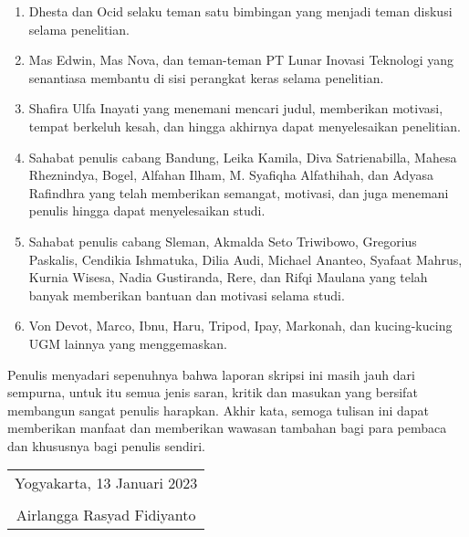 \begin{enumerate}
	\item Dhesta dan Ocid selaku teman satu bimbingan yang menjadi teman diskusi selama penelitian.
	
	\item Mas Edwin, Mas Nova, dan teman-teman PT Lunar Inovasi Teknologi yang senantiasa membantu di sisi perangkat keras selama penelitian.
	
	\item Shafira Ulfa Inayati yang menemani mencari judul, memberikan motivasi, tempat berkeluh kesah, dan hingga akhirnya dapat menyelesaikan penelitian.
	
	\item Sahabat penulis cabang Bandung, Leika Kamila, Diva Satrienabilla, Mahesa Rheznindya, Bogel, Alfahan Ilham, M. Syafiqha Alfathihah, dan Adyasa Rafindhra yang telah memberikan semangat, motivasi, dan juga menemani penulis hingga dapat menyelesaikan studi.
	
	\item Sahabat penulis cabang Sleman, Akmalda Seto Triwibowo, Gregorius Paskalis, Cendikia Ishmatuka, Dilia Audi, Michael Ananteo, Syafaat Mahrus, Kurnia Wisesa, Nadia Gustiranda, Rere, dan Rifqi Maulana yang telah banyak memberikan bantuan dan motivasi selama studi.
	
	\item Von Devot, Marco, Ibnu, Haru, Tripod, Ipay, Markonah, dan kucing-kucing UGM lainnya yang menggemaskan.

\end{enumerate}

Penulis menyadari sepenuhnya bahwa laporan skripsi ini masih jauh dari sempurna, untuk itu semua jenis saran, kritik dan masukan yang bersifat membangun sangat penulis harapkan. Akhir kata, semoga tulisan ini dapat memberikan manfaat dan memberikan wawasan tambahan bagi para pembaca dan khususnya bagi penulis sendiri.

\begin{flushright}
	\begin{tabular}{c}
		Yogyakarta, 13 Januari 2023 \\
		\vspace{1cm} \\
		Airlangga Rasyad Fidiyanto
	\end{tabular}
\end{flushright}